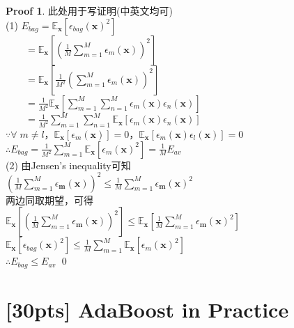 \documentclass[a4paper,UTF8]{article}
\numberwithin{equation}{section}
\theoremstyle{definition}
\newtheorem*{prove}{Proof}
\begin{document}
\begin{prove}
此处用于写证明(中英文均可)\\
(1)
$E_{bag}=\mathbb{E}_{\mathbf{x}}[\epsilon_{bag}(\mathbf{x})^2]$\\
$ \qquad =\mathbb{E}_{\mathbf{x}}[(\frac{1}{M} \sum_{m=1}^M \epsilon_{m}(\mathbf{x}))^2]$\\
$ \qquad =\mathbb{E}_{\mathbf{x}}[\frac{1}{M^2} ( \sum_{m=1}^M \epsilon_m(\mathbf{x}) )^2]$\\
$ \qquad =\frac{1}{M^2} \mathbb{E}_{\mathbf{x}} [ \sum_{m=1}^M \sum_{n=1}^M \epsilon_m(\mathbf{x})\epsilon_n(\mathbf{x}) ]$\\
$ \qquad =\frac{1}{M^2} \sum_{m=1}^M \sum_{n=1}^M \mathbb{E}_{\mathbf{x}} [ \epsilon_m(\mathbf{x})\epsilon_n(\mathbf{x}) ]$\\
$\because \forall\; m\neq l$，$ \mathbb{E}_{\mathbf{x}}[\epsilon_m(\mathbf{x})]=0$，$ \mathbb{E}_{\mathbf{x}}[\epsilon_m(\mathbf{x})\epsilon_l(\mathbf{x})]=0$\\
$\therefore E_{bag} = \frac{1}{M^2} \sum_{m=1}^M \mathbb{E}_{\mathbf{x}} [ \epsilon_m(\mathbf{x})^2 ]=\frac{1}{M} E_{av}$\\
(2)
由Jensen's inequality可知\\
$(\frac{1}{M} \sum_{m=1}^M \epsilon_{\mathbf{m}} (\mathbf{x}))^2 \leq \frac{1}{M}\sum_{m=1}^M \epsilon_{\mathbf{m}} (\mathbf{x})^2$\\
两边同取期望，可得\\
$\mathbb{E}_{\mathbf{x}} [(\frac{1}{M} \sum_{m=1}^M \epsilon_{\mathbf{m}} (\mathbf{x}))^2]  \leq \mathbb{E}_{\mathbf{x}} [\frac{1}{M}\sum_{m=1}^M \epsilon_{\mathbf{m}} (\mathbf{x})^2 ]$\\
$\mathbb{E}_{\mathbf{x}}[\epsilon_{bag}(\mathbf{x})^2] \leq \frac{1}{M} \sum_{m=1}^M \mathbb{E}_{\mathbf{x}} [ \epsilon_m(\mathbf{x})^2 ]$\\
$\therefore E_{bag} \leq E_{av}$
\qed
\end{prove}

\section{[30pts] AdaBoost in Practice}
\end{document}
